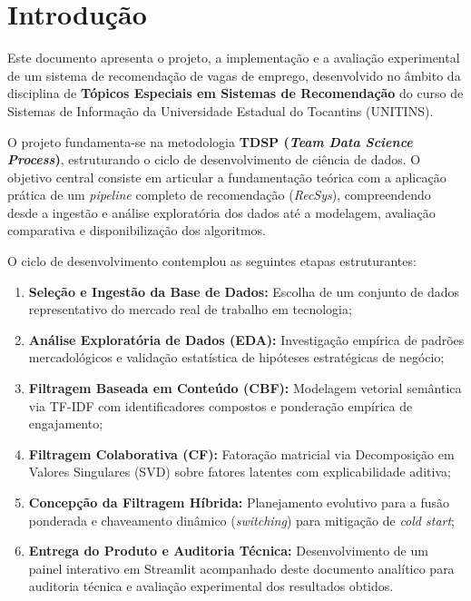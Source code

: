 
\section{Introdução}
\label{sec:introducao}

Este documento apresenta o projeto, a implementação e a avaliação experimental de um sistema de recomendação de vagas de emprego, desenvolvido no âmbito da disciplina de \textbf{Tópicos Especiais em Sistemas de Recomendação} do curso de Sistemas de Informação da Universidade Estadual do Tocantins (UNITINS). 

O projeto fundamenta-se na metodologia \textbf{TDSP (\textit{Team Data Science Process})}, estruturando o ciclo de desenvolvimento de ciência de dados. O objetivo central consiste em articular a fundamentação teórica com a aplicação prática de um \textit{pipeline} completo de recomendação (\textit{RecSys}), compreendendo desde a ingestão e análise exploratória dos dados até a modelagem, avaliação comparativa e disponibilização dos algoritmos.

O ciclo de desenvolvimento contemplou as seguintes etapas estruturantes:
\begin{enumerate}
    \item \textbf{Seleção e Ingestão da Base de Dados:} Escolha de um conjunto de dados representativo do mercado real de trabalho em tecnologia;
    \item \textbf{Análise Exploratória de Dados (EDA):} Investigação empírica de padrões mercadológicos e validação estatística de hipóteses estratégicas de negócio;
    \item \textbf{Filtragem Baseada em Conteúdo (CBF):} Modelagem vetorial semântica via TF-IDF com identificadores compostos e ponderação empírica de engajamento;
    \item \textbf{Filtragem Colaborativa (CF):} Fatoração matricial via Decomposição em Valores Singulares (SVD) sobre fatores latentes com explicabilidade aditiva;
    \item \textbf{Concepção da Filtragem Híbrida:} Planejamento evolutivo para a fusão ponderada e chaveamento dinâmico (\textit{switching}) para mitigação de \textit{cold start};
    \item \textbf{Entrega do Produto e Auditoria Técnica:} Desenvolvimento de um painel interativo em Streamlit acompanhado deste documento analítico para auditoria técnica e avaliação experimental dos resultados obtidos.
\end{enumerate}

